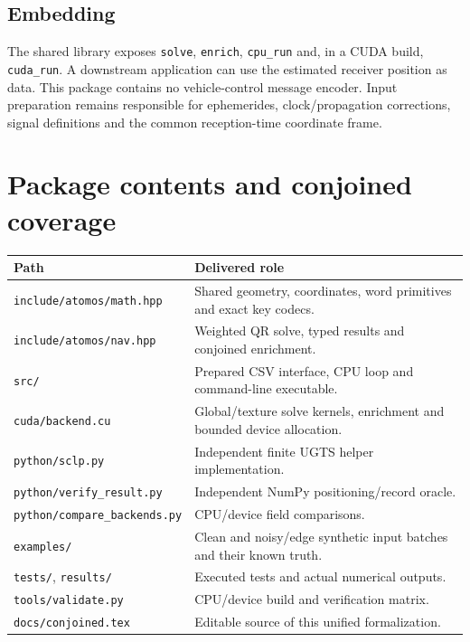 \documentclass[11pt,a4paper]{article}
\newcommand{\code}[1]{\texttt{#1}}
\begin{document}
\subsection{Embedding}
The shared library exposes \code{solve}, \code{enrich}, \code{cpu\_run} and, in a CUDA build,
\code{cuda\_run}. A downstream application can use the estimated receiver position as data. This package
contains no vehicle-control message encoder. Input preparation remains responsible for ephemerides,
clock/propagation corrections, signal definitions and the common reception-time coordinate frame.
\clearpage

\section{Package contents and conjoined coverage}
\par\small
\begin{tabularx}{\textwidth}{@{}P{.39\textwidth}Y@{}}\toprule
\textbf{Path} & \textbf{Delivered role}\\\midrule
\code{include/atomos/math.hpp} & Shared geometry, coordinates, word primitives and exact key codecs.\\
\code{include/atomos/nav.hpp} & Weighted QR solve, typed results and conjoined enrichment.\\
\code{src/} & Prepared CSV interface, CPU loop and command-line executable.\\
\code{cuda/backend.cu} & Global/texture solve kernels, enrichment and bounded device allocation.\\
\code{python/sclp.py} & Independent finite UGTS helper implementation.\\
\code{python/verify\_result.py} & Independent NumPy positioning/record oracle.\\
\code{python/compare\_backends.py} & CPU/device field comparisons.\\
\code{examples/} & Clean and noisy/edge synthetic input batches and their known truth.\\
\code{tests/}, \code{results/} & Executed tests and actual numerical outputs.\\
\code{tools/validate.py} & CPU/device build and verification matrix.\\
\code{docs/conjoined.tex} & Editable source of this unified formalization.\\\bottomrule
\end{tabularx}
\par\normalsize
\end{document}
